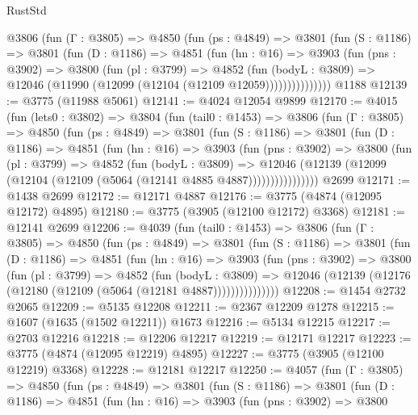 \begin{lexlean}{RustStd}
\begin{coremodule}
        @3806
          (fun (Γ : @3805) =>
          @4850
            (fun (ps : @4849) =>
            @3801
              (fun (S : @1186) =>
              @3801
                (fun (D : @1186) =>
                @4851
                  (fun (hn : @16) =>
                  @3903
                    (fun (pns : @3902) =>
                    @3800
                      (fun (pl : @3799) =>
                      @4852
                        (fun (bodyL : @3809) =>
                        @12046 (@11990 (@12099 (@12104 (@12109 @12059)))))))))))))))
    @1188
@12139 := @3775 (@11988 @5061)
@12141 := @4024 @12054 @9899
@12170 := @4015
    (fun (lets0 : @3802) =>
    @3804
      (fun (tail0 : @1453) =>
      @3806
        (fun (Γ : @3805) =>
        @4850
          (fun (ps : @4849) =>
          @3801
            (fun (S : @1186) =>
            @3801
              (fun (D : @1186) =>
              @4851
                (fun (hn : @16) =>
                @3903
                  (fun (pns : @3902) =>
                  @3800
                    (fun (pl : @3799) =>
                    @4852
                      (fun (bodyL : @3809) =>
                      @12046
                        (@12139 (@12099 (@12104 (@12109 (@5064 (@12141 @4885 @4887))))))))))))))))
    @2699
@12171 := @1438 @2699
@12172 := @12171 @4887
@12176 := @3775 (@4874 (@12095 @12172) @4895)
@12180 := @3775 (@3905 (@12100 @12172) @3368)
@12181 := @12141 @2699
@12206 := @4039
    (fun (tail0 : @1453) =>
    @3806
      (fun (Γ : @3805) =>
      @4850
        (fun (ps : @4849) =>
        @3801
          (fun (S : @1186) =>
          @3801
            (fun (D : @1186) =>
            @4851
              (fun (hn : @16) =>
              @3903
                (fun (pns : @3902) =>
                @3800
                  (fun (pl : @3799) =>
                  @4852
                    (fun (bodyL : @3809) =>
                    @12046 (@12139 (@12176 (@12180 (@12109 (@5064 (@12181 @4887)))))))))))))))
@12208 := @1454 @2732 @2065
@12209 := @5135 @12208
@12211 := @2367 @12209 @1278
@12215 := @1607 (@1635 (@1502 @12211)) @1673
@12216 := @5134 @12215
@12217 := @2703 @12216
@12218 := @12206 @12217
@12219 := @12171 @12217
@12223 := @3775 (@4874 (@12095 @12219) @4895)
@12227 := @3775 (@3905 (@12100 @12219) @3368)
@12228 := @12181 @12217
@12250 := @4057
    (fun (Γ : @3805) =>
    @4850
      (fun (ps : @4849) =>
      @3801
        (fun (S : @1186) =>
        @3801
          (fun (D : @1186) =>
          @4851
            (fun (hn : @16) =>
            @3903
              (fun (pns : @3902) =>
              @3800

\end{coremodule}
\end{lexlean}
